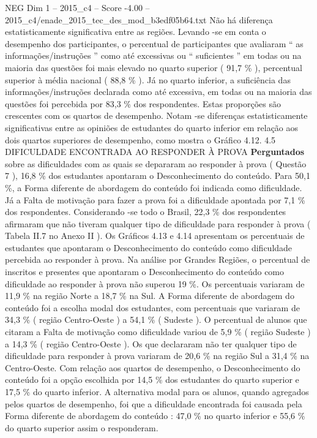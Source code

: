 \begin{textsample}{NEG Dim 1 – 2015\_c4 – Score -4.00 – 2015\_c4/enade\_2015\_tec\_des\_mod\_b3edf05b64.txt}
Não há diferença estatisticamente significativa entre as regiões.
Levando -se em conta o desempenho dos participantes, o percentual de participantes que avaliaram “ as informações/instruções ” como até excessivas ou “ suficientes ” em todas ou na maioria das questões foi mais elevado no quarto superior ( 91,7 \% ), percentual superior à média nacional ( 88,8 \% ).
Já no quarto inferior, a suficiência das informações/instruções declarada como até excessiva, em todas ou na maioria das questões foi percebida por 83,3 \% dos respondentes.
Estas proporções são crescentes com os quartos de desempenho.
Notam -se diferenças estatisticamente significativas entre as opiniões de estudantes do quarto inferior em relação aos dois quartos superiores de desempenho, como mostra o Gráfico 4.12. 4.5 DIFICULDADE ENCONTRADA AO RESPONDER À PROVA \textbf{Perguntados} sobre as dificuldades com as quais se depararam ao responder à prova ( Questão 7 ), 16,8 \% dos estudantes apontaram o Desconhecimento do conteúdo.
Para 50,1 \%, a Forma diferente de abordagem do conteúdo foi indicada como dificuldade.
Já a Falta de motivação para fazer a prova foi a dificuldade apontada por 7,1 \% dos respondentes.
Considerando -se todo o Brasil, 22,3 \% dos respondentes afirmaram que não tiveram qualquer tipo de dificuldade para responder à prova ( Tabela II.7 no Anexo II ).
Os Gráficos 4.13 e 4.14 apresentam os percentuais de estudantes que apontaram o Desconhecimento do conteúdo como dificuldade percebida ao responder à prova.
Na análise por Grandes Regiões, o percentual de inscritos e presentes que apontaram o Desconhecimento do conteúdo como dificuldade ao responder à prova não superou 19 \%.
Os percentuais variaram de 11,9 \% na região Norte a 18,7 \% na Sul.
A Forma diferente de abordagem do conteúdo foi a escolha modal dos estudantes, com percentuais que variaram de 34,3 \% ( região Centro-Oeste ) a 54,1 \% ( Sudeste ).
O percentual de alunos que citaram a Falta de motivação como dificuldade variou de 5,9 \% ( região Sudeste ) a 14,3 \% ( região Centro-Oeste ).
Os que declararam não ter qualquer tipo de dificuldade para responder à prova variaram de 20,6 \% na região Sul a 31,4 \% na Centro-Oeste.
Com relação aos quartos de desempenho, o Desconhecimento do conteúdo foi a opção escolhida por 14,5 \% dos estudantes do quarto superior e 17,5 \% do quarto inferior.
A alternativa modal para os alunos, quando agregados pelos quartos de desempenho, foi que a dificuldade encontrada foi causada pela Forma diferente de abordagem do conteúdo : 47,0 \% no quarto inferior e 55,6 \% do quarto superior assim o responderam.

\end{textsample}
